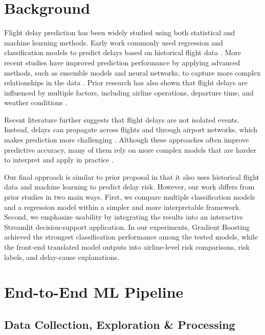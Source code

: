 \section{Background}

Flight delay prediction has been widely studied using both statistical and machine learning methods. Early work commonly used regression and classification models to predict delays based on historical flight data \cite{tang2021airline}. More recent studies have improved prediction performance by applying advanced methods, such as ensemble models and neural networks, to capture more complex relationships in the data \cite{jiang2020aviation}. Prior research has also shown that flight delays are influenced by multiple factors, including airline operations, departure time, and weather conditions \cite{choi2016weather}.

Recent literature further suggests that flight delays are not isolated events. Instead, delays can propagate across flights and through airport networks, which makes prediction more challenging \cite{chen2019chained, wu2019propagation}. Although these approaches often improve predictive accuracy, many of them rely on more complex models that are harder to interpret and apply in practice \cite{zoutendijk2021probabilistic}.

Our final approach is similar to prior  proposal in that it also uses historical flight data and machine learning to predict delay risk. However, our work differs from prior studies in two main ways. First, we compare multiple classification models and a regression model within a simpler and more interpretable framework. Second, we emphasize usability by integrating the results into an interactive Streamlit decision-support application. In our experiments, Gradient Boosting achieved the strongest classification performance among the tested models, while the front-end translated model outputs into airline-level risk comparisons, risk labels, and delay-cause explanations.
\section{End-to-End ML Pipeline}

\subsection{Data Collection, Exploration \& Processing}

